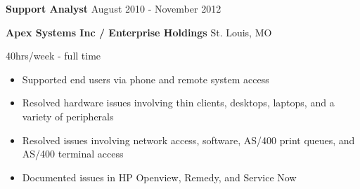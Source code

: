 \documentclass[../main.tex]{subfiles}
\begin{document}
\textbf{Support Analyst} 
\hfill 
August 2010 - November 2012

\textbf{Apex Systems Inc / Enterprise Holdings}
\hfill
St. Louis, MO

\hfill
40hrs/week - full time
\begin{itemize}
\item Supported end users via phone and remote system access
\item Resolved hardware issues involving thin clients, desktops, laptops, and a variety of peripherals
\item Resolved issues involving network access, software, AS/400 print queues, and AS/400 terminal access
\item Documented issues in HP Openview, Remedy, and Service Now
\end{itemize}
\end{document}
